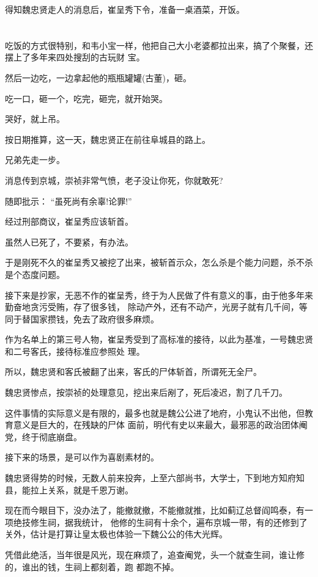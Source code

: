 \documentclass[11pt,a4paper,onecolumn]{article}
\begin{document}
得知魏忠贤走人的消息后，崔呈秀下令，准备一桌酒菜，开饭。

\section[\thesection]{}

吃饭的方式很特别，和韦小宝一样，他把自己大小老婆都拉出来，搞了个聚餐，还摆上了多年来四处搜刮的古玩财
宝。

然后一边吃，一边拿起他的瓶瓶罐罐(古董)，砸。

吃一口，砸一个，吃完，砸完，就开始哭。

哭好，就上吊。

按日期推算，这一天，魏忠贤正在前往阜城县的路上。

兄弟先走一步。

消息传到京城，崇祯非常气愤，老子没让你死，你就敢死?

随即批示： ``虽死尚有余辜!论罪!''

经过刑部商议，崔呈秀应该斩首。

虽然人已死了，不要紧，有办法。

于是刚死不久的崔呈秀又被挖了出来，被斩首示众，怎么杀是个能力问题，杀不杀是个态度问题。

接下来是抄家，无恶不作的崔呈秀，终于为人民做了件有意义的事，由于他多年来勤奋地贪污受贿，存了很多钱，
除动产外，还有不动产，光房子就有几千间，等同于替国家攒钱，免去了政府很多麻烦。

作为名单上的第三号人物，崔呈秀受到了高标准的接待，以此为基准，一号魏忠贤和二号客氏，接待标准应参照处
理。

所以，魏忠贤和客氏被翻了出来，客氏的尸体斩首，所谓死无全尸。

魏忠贤惨点，按崇祯的处理意见，挖出来后剐了，死后凌迟，割了几千刀。

这件事情的实际意义是有限的，最多也就是魏公公进了地府，小鬼认不出他，但教育意义是巨大的，在残缺的尸体
面前，明代有史以来最大，最邪恶的政治团体阉党，终于彻底崩盘。

接下来的场景，是可以作为喜剧素材的。

魏忠贤得势的时候，无数人前来投奔，上至六部尚书，大学士，下到地方知府知县，能拉上关系，就是千恩万谢。

现在而今眼目下，没办法了，能撤就撤，不能撤就推，比如蓟辽总督阎鸣泰，有一项绝技\myrule 修生祠，据我统计，
他修的生祠有十余个，遍布京城一带，有的还修到了关外，估计是打算让皇太极也体验一下魏公公的伟大光辉。

凭借此绝活，当年很是风光，现在麻烦了，追查阉党，头一个就查生祠，谁让修的，谁出的钱，生祠上都刻着，跑
都跑不掉。
\end{document}
